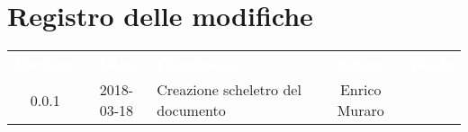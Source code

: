 \section*{Registro delle modifiche}
{
	\renewcommand{\arraystretch}{1.5}
	\centering
	\begin{longtable}{ c c C{6cm} c c }
		\textcolor{white}{\textbf{Versione}} & \textcolor{white}{\textbf{Data}} & \textcolor{white}{\textbf{Descrizione}} & \textcolor{white}{\textbf{Autore}} & \textcolor{white}{\textbf{Ruolo}}\\
		
		0.0.1 & 2018-03-18 & Creazione scheletro del documento & Enrico Muraro & \reda{}\\
		
	\end{longtable}

}
